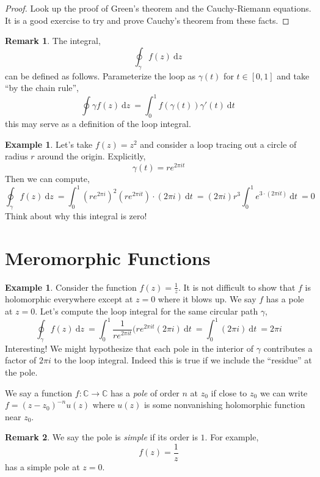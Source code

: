 \documentclass{article}
\newcommand{\C}{\mathbb{C}}
\renewcommand{\d}[1]{\: \mathrm{d}#1 \:}
\theoremstyle{definition}
\newtheorem{example}[theorem]{Example}
\newtheorem{remark}{Remark}[section]
\newenvironment{definition}[1][Definition:]{\begin{trivlist}
\item[\hskip \labelsep {\bfseries #1}]}{\end{trivlist}}
\begin{document}
\begin{proof}
Look up the proof of Green's theorem and the Cauchy-Riemann equations. It is a good exercise to try and prove Cauchy's theorem from these facts.
\end{proof}

\begin{remark}
The integral,
\[ \oint_\gamma f(z) \d{z}  \]
can be defined as follows. Parameterize the loop as $\gamma(t)$ for $t \in [0, 1]$ and take ``by the chain rule'',
\[ \oint \gamma f(z) \d{z} = \int_0^1 f(\gamma(t)) \gamma'(t) \d{t} \]
this may serve as a definition of the loop integral.
\end{remark}

\begin{example}
Let's take $f(z) = z^2$ and consider a loop tracing out a circle of radius $r$ around the origin. Explicitly,
\[ \gamma(t) = r e^{2 \pi i t} \]
Then we can compute,
\[ \oint_\gamma f(z) \d{z} = \int_0^1 (r e^{2 \pi i})^2 (r e^{2 \pi i t}) \cdot (2 \pi i) \d{t} = (2 \pi i) r^3  \int_0^1 e^{3 \cdot (2 \pi i t)} \d{t} = 0 \]
Think about why this integral is zero!  
\end{example}

\section{Meromorphic Functions}

\begin{example}
Consider the function $f(z) = \frac{1}{z}$. It is not difficult to show that $f$ is holomorphic everywhere except at $z = 0$ where it blows up. We say $f$ has a pole at $z = 0$. Let's compute the loop integral for the same circular path $\gamma$,
\[ \oint_{\gamma} f(z) \d{z} = \int_0^1 \frac{1}{r e^{2 \pi i t}} (r e^{2 \pi i t} (2 \pi i) \d{t} = \int_0^1 (2 \pi i) \d{t} = 2 \pi i \]
Interesting! We might hypothesize that each pole in the interior of $\gamma$ contributes a factor of $2 \pi i$ to the loop integral. Indeed this is true if we include the ``residue'' at the pole.
\end{example}

\begin{definition}
We say a function $f : \C \to \C$ has a \textit{pole} of order $n$ at $z_0$ if close to $z_0$ we can write $f = (z - z_0)^{-n} u(z)$ where $u(z)$ is some nonvanishing holomorphic function near $z_0$.
\end{definition}

\begin{remark}
We say the pole is \textit{simple} if its order is $1$. For example,
\[ f(z) = \frac{1}{z} \]
has a simple pole at $z = 0$.
\end{remark}
\end{document}
